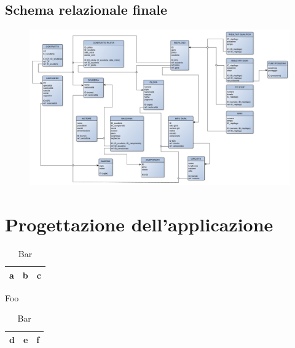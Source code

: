 \documentclass[a4paper,12pt]{report}
\begin{document}
	\section{Schema relazionale finale}
	\begin{figure}[htbp]
		\centering
		\includegraphics[scale=0.8]{copies/schemaFinale.pdf}
	\end{figure}
	\section{}
	
	\chapter{Progettazione dell'applicazione}
		\begin{table}
			\parbox{.45\linewidth}{
				\centering
				\begin{tabular}{|c|c|c|}
					\hline
					a&b&c\\
					\hline
				\end{tabular}
				\caption{Foo}
			}
			\hfill
			\parbox{.45\linewidth}{
				\centering
				\begin{tabular}{ccc}
					\hline
					d&e&f\\
					\hline
				\end{tabular}
				\caption{Bar}
			}
		\end{table}
\end{document}

